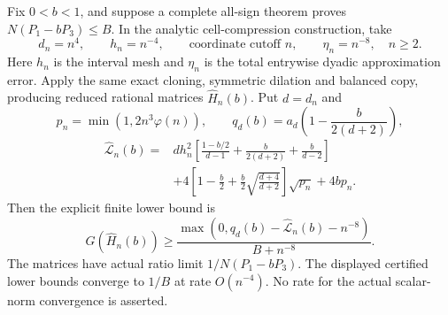 \begin{proposition}
\label{prop:new-powered-cubic-sequence}
Fix $0<b<1$, and suppose a complete all-sign theorem proves
$N(P_1-bP_3)\leq B$.  In the analytic cell-compression construction,
take
\[
 d_n=n^4,\qquad h_n=n^{-4},\qquad \text{coordinate cutoff }n,
                   \qquad \eta_n=n^{-8},\quad n\geq2.
\]
Here $h_n$ is the interval mesh and $\eta_n$ is the total entrywise
dyadic approximation error.  Apply the same exact cloning, symmetric
dilation and balanced copy, producing reduced rational matrices
$\widehat H_n(b)$.  Put $d=d_n$ and
\[
 p_n=\min(1,2n^3\varphi(n)),\qquad
 q_d(b)=a_d\left(1-\frac b{2(d+2)}\right),
\]
\begin{align*}
 \widehat{\mathcal L}_n(b)={}&dh_n^2
 \left[\frac{1-b/2}{d-1}+\frac b{2(d+2)}+\frac b{d-2}\right]\\
 &+4\left[1-\frac b2+\frac b2\sqrt{\frac{d+4}{d+2}}\right]
                         \sqrt{p_n}+4bp_n.
\end{align*}
Then the explicit finite lower bound is
\[
 G(\widehat H_n(b))\geq
 \frac{\max(0,q_d(b)-\widehat{\mathcal L}_n(b)-n^{-8})}
                           {B+n^{-8}}.
\]
The matrices have actual ratio limit $1/N(P_1-bP_3)$.
The displayed certified lower bounds converge to $1/B$ at rate
$O(n^{-4})$.  No rate for the actual scalar-norm convergence is
asserted.
\end{proposition}
